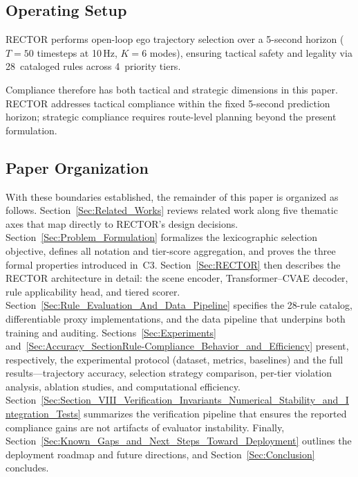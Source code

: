 \subsection{Operating Setup}
\label{subsec:scope}

\textsc{RECTOR} performs open-loop ego trajectory selection over a 5-second horizon ($T{=}50$ timesteps at 10\,Hz, $K{=}6$ modes), ensuring tactical safety and legality via 28~cataloged rules across 4~priority tiers.

Compliance therefore has both tactical and strategic dimensions in this paper.  RECTOR addresses tactical compliance within the fixed 5-second prediction horizon; strategic compliance requires route-level planning beyond the present formulation.

\subsection{Paper Organization}
\label{subsec:organization}

With these boundaries established, the remainder of this paper is organized as follows.  Section~\ref{Sec:Related_Works} reviews related work along five thematic axes that map directly to RECTOR’s design decisions. Section~\ref{Sec:Problem_Formulation} formalizes the lexicographic selection
objective, defines all notation and tier-score aggregation, and proves the three formal properties introduced in~C3. Section~\ref{Sec:RECTOR} then describes the RECTOR architecture in detail: the scene encoder, Transformer–CVAE decoder, rule applicability head, and tiered scorer.  Section~\ref{Sec:Rule_Evaluation_And_Data_Pipeline} specifies the 28-rule catalog, differentiable proxy implementations, and the data pipeline that underpins both training and auditing. Sections~\ref{Sec:Experiments} and~\ref{Sec:Accuracy_SectionRule-Compliance_Behavior_and_Efficiency}
present, respectively, the experimental protocol (dataset, metrics, baselines) and the full results—trajectory accuracy, selection strategy comparison, per-tier violation analysis, ablation studies, and computational
efficiency. Section~\ref{Sec:Section_VIII_Verification_Invariants_Numerical_Stability_and_Integration_Tests}
summarizes the verification pipeline that ensures the reported compliance gains are not artifacts of evaluator instability.  Finally, Section~\ref{Sec:Known_Gaps_and_Next_Steps_Toward_Deployment} outlines the deployment roadmap and future directions, and Section~\ref{Sec:Conclusion} concludes.

